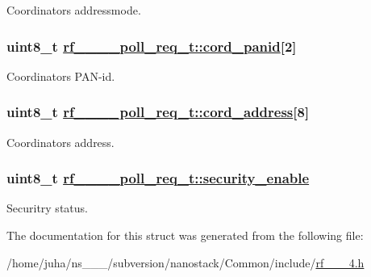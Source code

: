 Coordinators addressmode. \hypertarget{structrf__802__15__4__poll__req__t_9d3a01a8f05572f8d05984c79ca61648}{
\subsubsection[cord\_\-panid]{\setlength{\rightskip}{0pt plus 5cm}uint8\_\-t \hyperlink{structrf__802__15__4__poll__req__t_9d3a01a8f05572f8d05984c79ca61648}{rf\_\_\_\_\-poll\_\-req\_\-t::cord\_\-panid}\mbox{[}2\mbox{]}}}
\label{structrf__802__15__4__poll__req__t_9d3a01a8f05572f8d05984c79ca61648}


Coordinators PAN-id. \hypertarget{structrf__802__15__4__poll__req__t_705d43433da57f0838952b04bbedba91}{
\subsubsection[cord\_\-address]{\setlength{\rightskip}{0pt plus 5cm}uint8\_\-t \hyperlink{structrf__802__15__4__poll__req__t_705d43433da57f0838952b04bbedba91}{rf\_\_\_\_\-poll\_\-req\_\-t::cord\_\-address}\mbox{[}8\mbox{]}}}
\label{structrf__802__15__4__poll__req__t_705d43433da57f0838952b04bbedba91}


Coordinators address. \hypertarget{structrf__802__15__4__poll__req__t_45a257887c33a9ab4551e27237f8c848}{
\subsubsection[security\_\-enable]{\setlength{\rightskip}{0pt plus 5cm}uint8\_\-t \hyperlink{structrf__802__15__4__poll__req__t_45a257887c33a9ab4551e27237f8c848}{rf\_\_\_\_\-poll\_\-req\_\-t::security\_\-enable}}}
\label{structrf__802__15__4__poll__req__t_45a257887c33a9ab4551e27237f8c848}


Securitry status. 

The documentation for this struct was generated from the following file:\begin{CompactItemize}
\item 
/home/juha/ns\_\_\_/subversion/nanostack/Common/include/\hyperlink{rf__802__15__4_8h}{rf\_\_\_\-4.h}\end{CompactItemize}
